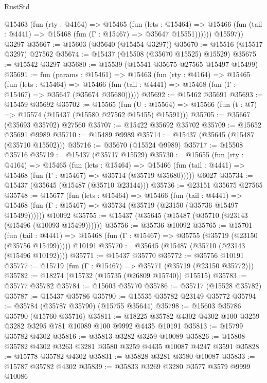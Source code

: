 \begin{lexlean}{RustStd}
\begin{coremodule}
          @15463
            (fun (rty : @4164) =>
            @15465
              (fun (lets : @15464) =>
              @15466 (fun (tail : @4441) => @15468 (fun (Γ : @15467) => @35647 @15551))))))
        @15597))
    @3297
@35667 := @15603 (@35640 (@15454 @3297))
@35670 := @15516 (@15517 @3297) @27562
@35674 := @15437 (@15508 (@35670 @15525) @15529)
@35675 := @15542 @3297
@35680 := @15539 (@15541 @35675 @27565 @15497 @15499)
@35691 := fun (params : @15461) =>
  @15463
    (fun (rty : @4164) =>
    @15465
      (fun (lets : @15464) =>
      @15466 (fun (tail : @4441) => @15468 (fun (Γ : @15467) => @35647 (@35674 @35680)))))
@35692 := @15462 @35691
@35693 := @15459 @35692
@35702 := @15565
    (fun (U : @15564) => @15566 (fun (t : @7) => @15574 (@15437 (@15580 @27562 @15455) @15591)))
@35705 := @35667 (@35693 @35702) @27560
@35707 := @15422 @35692 @35702
@35709 := @15652 @35691 @9989
@35710 := @15489 @9989
@35714 := @15437 (@35645 (@15487 (@35710 @15502)))
@35716 := @35670 (@15524 @9989)
@35717 := @15508 @35716
@35719 := @15437 (@35717 @15529)
@35730 := @15655
    (fun (rty : @4164) =>
    @15465
      (fun (lets : @15464) =>
      @15466 (fun (tail : @4441) => @15468 (fun (Γ : @15467) => @35714 (@35719 @35680)))))
    @6027
@35734 := @15437 (@35645 (@15487 (@35710 @23144)))
@35736 := @23151 @35675 @27565
@35748 := @15677
    (fun (lets : @15464) =>
    @15466
      (fun (tail : @4441) =>
      @15468 (fun (Γ : @15467) => @35734 (@35719 (@23150 (@35736 @15497 @15499))))))
    @10092
@35755 := @15437 (@35645 (@15487 (@35710 (@23143 (@15496 (@10093 @15499))))))
@35756 := @35736 @10092
@35765 := @15701
    (fun (tail : @4441) => @15468 (fun (Γ : @15467) => @35755 (@35719 (@23150 (@35756 @15499)))))
    @10191
@35770 := @35645 (@15487 (@35710 (@23143 (@15496 @10192))))
@35771 := @15437 @35770
@35772 := @35756 @10191
@35777 := @15719 (fun (Γ : @15467) => @35771 (@35719 (@23150 @35772)))
@35782 := @18274 (@15732 (@15735 (@26809 @15740)) @15515)
@35783 := @35777 @35782
@35784 := @15603 @35770
@35786 := @35717 (@15528 @35782)
@35787 := @15437 @35786
@35790 := @15535 @35782 @23149 @35772
@35794 := @35784 (@35787 @35790) (@15755 @35644)
@35798 := @15603 @35786 @35790 (@15760 @35716)
@35811 := @18225 @35782 @4302 @4302 @100 @3259 @3282 @3295 @781 @10089 @100 @9992 @4435 @10191
@35813 := @15799 @35782 @4302
@35816 := @35813 @3282 @3259 @10089
@35826 := @15808 @35782 @4302 @3263 @3281 @3580 @3259 @4435 @10087 @4247 @3591
@35828 := @15778 @35782 @4302
@35831 := @35828 @3281 @3580 @10087
@35833 := @15787 @35782 @4302
@35839 := @35833 @3269 @3280 @3577 @3579 @9999 @10086

\end{coremodule}
\end{lexlean}
